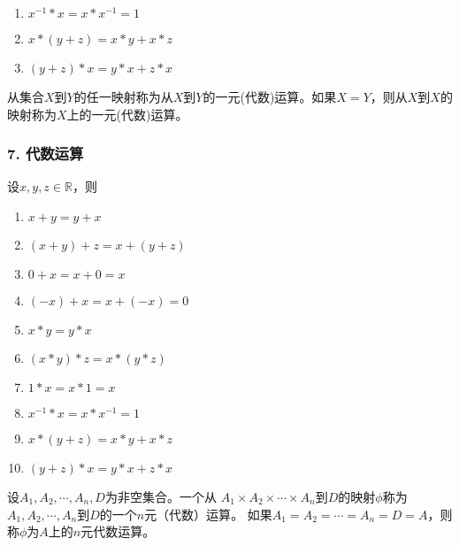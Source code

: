 \documentclass{beamer}
\begin{document}
\begin{CJK*}{UTF8}{gbsn}
\begin{frame}
\begin{minipage}[t]{0.49\linewidth}
\begin{block}{}
\begin{enumerate}
   \item   $x^{-1} * x = x * x^{-1} = 1$
   \item   $x* (y + z) = x * y + x * z$
   \item   $(y + z) * x = y * x + z * x$
    \end{enumerate}
  \end{block}\pause
\end{minipage}
\begin{minipage}[t]{0.49\linewidth}
  \begin{Def}
    从集合$X$到$Y$的任一映射称为从$X$到$Y$的\alert{一元(代数)运算}。如果$X=Y$，则从$X$到$X$的映射称为$X$上的\alert{一元(代数)运算}。
  \end{Def}
\end{minipage}
\end{frame}

\begin{frame}
  \frametitle{7. 代数运算}
  \begin{minipage}[t]{0.49\linewidth}
  \begin{block}{}
    设$x, y, z \in \mathbb{R}$，则
   \begin{enumerate}
   \item   $x + y = y + x$
   \item   $(x + y) + z = x + (y + z)$
   \item   $0 + x = x + 0 = x$
   \item   $(-x) + x = x + (-x) = 0$
   \item   $x * y = y * x$
   \item   $(x * y) * z = x * (y *z)$
   \item   $1 * x = x * 1 = x$
   \item   $x^{-1} * x = x * x^{-1} = 1$
   \item   $x* (y + z) = x * y + x * z$
   \item   $(y + z) * x = y * x + z * x$
    \end{enumerate}
  \end{block}\pause
\end{minipage}
\begin{minipage}[t]{0.49\linewidth}
  \begin{Def}
    设$A_1, A_2, \cdots, A_n, D$为非空集合。一个从 $A_1\times A_2\times \cdots \times A_n$到$D$的映射$\phi$称为$A_1, A_2, \cdots, A_n$到$D$的一个\alert{$n$元（代数）运算}。
    如果$A_1=A_2=\cdots=A_n=D=A$，则称$\phi$为$A$上的\alert{$n$元代数运算}。
  \end{Def}
\end{minipage}
\end{frame}


\end{CJK*}
\end{document}
